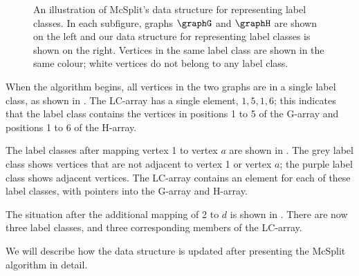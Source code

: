 \begin{figure}[h!]
{   
        \label{subfig:data-structure-c}
    }
\caption{An illustration of McSplit's data structure for representing label classes. In each subfigure,
graphs $\graphG$ and $\graphH$ are shown on the left and our data structure for representing label classes
is shown on the right. Vertices in the same label class are shown in the same colour; white vertices
do not belong to any label class.}
\label{fig:data-structure}
\end{figure}

When the algorithm begins, all vertices in the two graphs are in a single label class, as
shown in .  The LC-array has a single element, $1,5,1,6$; this indicates
that the label class contains the vertices in positions 1 to 5 of the G-array and positions 1 to 6
of the H-array.

The label classes after mapping vertex 1 to vertex $a$ are shown in .
The grey label class shows vertices that are not adjacent to vertex 1 or vertex $a$; the purple
label class shows adjacent vertices.  The LC-array contains an element for each of these label
classes, with pointers into the G-array and H-array.

The situation after the additional mapping of 2 to $d$ is shown in .
There are now three label classes, and three corresponding members of the LC-array.

We will describe how the data structure is updated after presenting the McSplit algorithm in detail.

